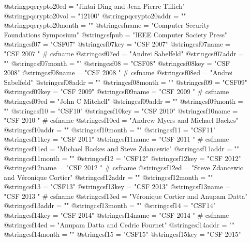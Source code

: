 @string{pqcrypto20ed =          "Jintai Ding and Jean-Pierre Tillich"}
@string{pqcrypto20vol =         "12100"}
@string{pqcrypto20addr =        ""}
@string{pqcrypto20month =       ""}
@string{csfname =               "Computer Security Foundations Symposium"}
@string{csfpub =                "{IEEE} Computer Society Press"}
@string{csf07 =                 "CSF07"}
@string{csf07key =              "CSF 2007"}
@string{csf07name =             "CSF 2007 " # csfname}
@string{csf07ed =               "Andrei Sabelfeld"}
@string{csf07addr =             ""}
@string{csf07month =            ""}
@string{csf08 =                 "CSF08"}
@string{csf08key =              "CSF 2008"}
@string{csf08name =             "CSF 2008 " # csfname}
@string{csf08ed =               "Andrei Sabelfeld"}
@string{csf08addr =             ""}
@string{csf08month =            ""}
@string{csf09 =                 "CSF09"}
@string{csf09key =              "CSF 2009"}
@string{csf09name =             "CSF 2009 " # csfname}
@string{csf09ed =               "John C Mitchell"}
@string{csf09addr =             ""}
@string{csf09month =            ""}
@string{csf10 =                 "CSF10"}
@string{csf10key =              "CSF 2010"}
@string{csf10name =             "CSF 2010 " # csfname}
@string{csf10ed =               "Andrew Myers and Michael Backes"}
@string{csf10addr =             ""}
@string{csf10month =            ""}
@string{csf11 =                 "CSF11"}
@string{csf11key =              "CSF 2011"}
@string{csf11name =             "CSF 2011 " # csfname}
@string{csf11ed =               "Michael Backes and Steve Zdancewic"}
@string{csf11addr =             ""}
@string{csf11month =            ""}
@string{csf12 =                 "CSF12"}
@string{csf12key =              "CSF 2012"}
@string{csf12name =             "CSF 2012 " # csfname}
@string{csf12ed =               "Steve Zdancewic and Véronique Cortier"}
@string{csf12addr =             ""}
@string{csf12month =            ""}
@string{csf13 =                 "CSF13"}
@string{csf13key =              "CSF 2013"}
@string{csf13name =             "CSF 2013 " # csfname}
@string{csf13ed =               "Véronique Cortier and Anupam Datta"}
@string{csf13addr =             ""}
@string{csf13month =            ""}
@string{csf14 =                 "CSF14"}
@string{csf14key =              "CSF 2014"}
@string{csf14name =             "CSF 2014 " # csfname}
@string{csf14ed =               "Anupam Datta and Cedric Fournet"}
@string{csf14addr =             ""}
@string{csf14month =            ""}
@string{csf15 =                 "CSF15"}
@string{csf15key =              "CSF 2015"}
